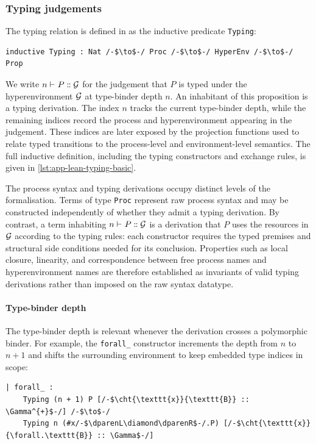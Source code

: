 \subsubsection{Typing judgements}\label{subsubsec:judgements}
The typing relation is defined in  as the inductive predicate \texttt{Typing}:

\begin{lstlisting}[language=Lean4]
inductive Typing : Nat /-$\to$-/ Proc /-$\to$-/ HyperEnv /-$\to$-/ Prop
\end{lstlisting}

We write ${{}n \vdash_{} P \mathrel{:\mspace{-1mu}:} \mathcal{G}}$ for the judgement that $P$ is typed under the hyperenvironment $\mathcal{G}$ at type-binder depth $n$. An inhabitant of this proposition is a typing derivation. The index $n$ tracks the current type-binder depth, while the remaining indices record the process and hyperenvironment appearing in the judgement. These indices are later exposed by the projection functions used to relate typed transitions to the process-level and environment-level semantics. The full inductive definition, including the typing constructors and exchange rules, is given in \cref{lst:app-lean-typing-basic}.

The process syntax and typing derivations occupy distinct levels of the formalisation. Terms of type \texttt{Proc} represent raw process syntax and may be constructed independently of whether they admit a typing derivation. By contrast, a term inhabiting ${{}n \vdash_{} P \mathrel{:\mspace{-1mu}:} \mathcal{G}}$ is a derivation that $P$ uses the resources in $\mathcal{G}$ according to the typing rules: each constructor requires the typed premises and structural side conditions needed for its conclusion. Properties such as local closure, linearity, and correspondence between free process names and hyperenvironment names are therefore established as invariants of valid typing derivations rather than imposed on the raw syntax datatype.

\paragraph{Type-binder depth}
The type-binder depth is relevant whenever the derivation crosses a polymorphic binder. For example, the \texttt{forall\_} constructor increments the depth from $n$ to $n+1$ and shifts the surrounding environment to keep embedded type indices in scope:

\begin{lstlisting}[language=Lean4]
| forall_ :
    Typing (n + 1) P [/-$\cht{\texttt{x}}{\texttt{B}} :: \Gamma^{+}$-/] /-$\to$-/
    Typing n (#x/-$\dparenL\diamond\dparenR$-/.P) [/-$\cht{\texttt{x}}{\forall.\texttt{B}} :: \Gamma$-/]
\end{lstlisting}

